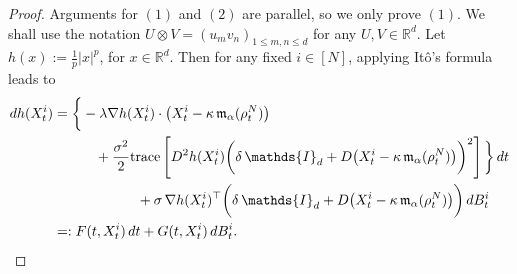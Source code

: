 \documentclass[10pt,a4paper]{amsart}
\newcommand{\rd}{{\rm d} }
\begin{document}
\begin{proof}
Arguments for $(1)$ and $(2)$ are parallel, so we only prove $(1)$. We shall use the notation $U\otimes V = (u_{m}v_{n})_{1\leq m,n\leq d}$ for any $U,V \in \mathbb{R}^{d}$.  Let $h(x):=\frac{1}{p}|x|^{p}$, for $x\in \mathbb{R}^{d}$. Then for any fixed $i\in[N]$, applying It\^{o}'s formula leads to
\begin{align*}
    \rd h(X^{i}_{t}) & = \bigg\{ -\lambda \nabla h(X^{i}_{t})\cdot \big(X^{i}_{t} - \kappa \, \mathfrak{m}_{\alpha}(\rho^{N}_{t})\big) \\
    & \quad \quad \quad + \frac{\sigma^{2}}{2} \text{trace}\left[D^{2}h(X^{i}_{t}) \bigg( \delta\,\mathds{I}_{d} + D\big(X^{i}_{t} - \kappa\,\mathfrak{m}_{\alpha}(\rho^{N}_{t})\big) \bigg)^{2} \right] \bigg\}\,\rd t \\
    & \quad \quad \quad \quad \quad \quad + \sigma\,\nabla h(X^{i}_{t})^{\top}\bigg( \delta\,\mathds{I}_{d} + D\big(X^{i}_{t} - \kappa\,\mathfrak{m}_{\alpha}(\rho^{N}_{t})\big) \bigg)\, \rd B^{i}_{t}\\
    & =: F(t,X_{t}^{i})\,\rd t + G(t,X_{t}^{i})\,\rd B^{i}_{t}.
\end{align*}


\end{proof}
\end{document}
